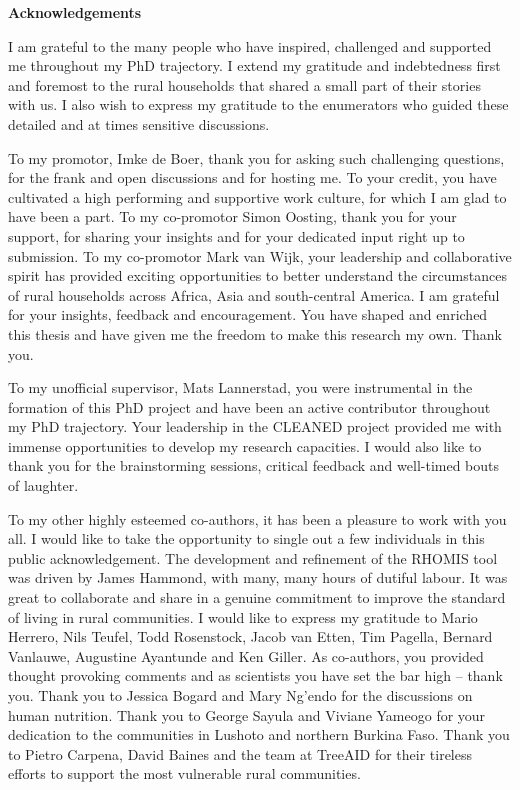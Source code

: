 {\Large\textbf{Acknowledgements}}

I am grateful to the many people who have inspired, challenged and supported me throughout my PhD trajectory. I extend my gratitude and indebtedness first and foremost to the rural households that shared a small part of their stories with us. I also wish to express my gratitude to the enumerators who guided these detailed and at times sensitive discussions.

To my promotor, Imke de Boer, thank you for asking such challenging questions, for the frank and open discussions and for hosting me. To your credit, you have cultivated a high performing and supportive work culture, for which I am glad to have been a part. To my co-promotor Simon Oosting, thank you for your support, for sharing your insights and for your dedicated input right up to submission. To my co-promotor Mark van Wijk, your leadership and collaborative spirit has provided exciting opportunities to better understand the circumstances of rural households across Africa, Asia and south-central America. I am grateful for your insights, feedback and encouragement. You have shaped and enriched this thesis and have given me the freedom to make this research my own. Thank you. 

To my unofficial supervisor, Mats Lannerstad, you were instrumental in the formation of this PhD project and have been an active contributor throughout my PhD trajectory. Your leadership in the CLEANED project provided me with immense opportunities to develop my research capacities. I would also like to thank you for the brainstorming sessions, critical feedback and well-timed bouts of laughter.  

To my other highly esteemed co-authors, it has been a pleasure to work with you all. I would like to take the opportunity to single out a few individuals in this public acknowledgement. The development and refinement of the RHOMIS tool was driven by James Hammond, with many, many hours of dutiful labour. It was great to collaborate and share in a genuine commitment to improve the standard of living in rural communities. I would like to express my gratitude to Mario Herrero, Nils Teufel, Todd Rosenstock, Jacob van Etten, Tim Pagella, Bernard Vanlauwe, Augustine Ayantunde and Ken Giller. As co-authors, you provided thought provoking comments and as scientists you have set the bar high -- thank you. Thank you to Jessica Bogard and Mary Ng'endo for the discussions on human nutrition. Thank you to George Sayula and Viviane Yameogo for your dedication to the communities in Lushoto and northern Burkina Faso. Thank you to Pietro Carpena, David Baines and the team at TreeAID for their tireless efforts to support the most vulnerable rural communities. 


